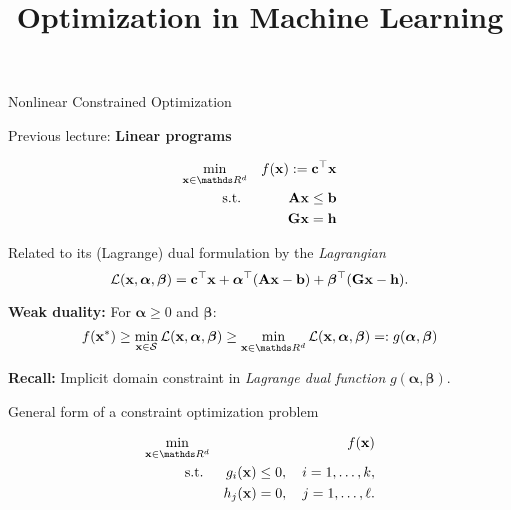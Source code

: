 \documentclass[11pt,compress,t,notes=noshow, xcolor=table]{beamer}
\title{Optimization in Machine Learning}
\begin{document}

\begin{vbframe}{Nonlinear Constrained Optimization}

Previous lecture: \textbf{Linear programs}

\vspace{-\baselineskip}

\begin{eqnarray*}
 \min_{\xv \in \R^d} && f(\xv) := \mathbf{c}^\top\xv \\
\text{s.t. } &&  \Amat \xv \le \mathbf{b}\\
             && \mathbf{G} \xv = \mathbf{h} 
\end{eqnarray*}

Related to its (Lagrange) dual formulation by the \textit{Lagrangian}
\begin{equation*}
    \mathcal{L}(\mathbf{x},\bm{\alpha},\bm{\beta}) = \mathbf{c}^\top \mathbf{x} + \bm{\alpha}^\top (\mathbf{A} \mathbf{x} - \mathbf{b}) + \bm{\beta}^\top (\mathbf{G} \mathbf{x} - \mathbf{h}).
\end{equation*}

\textbf{Weak duality:} For $\bm{\alpha} \geq 0$ and $\bm{\beta}$:
\begin{equation*}
    f(\xv^\ast) \geq \min_{\xv \in \mathcal{S}} \mathcal{L}(\xv, \bm{\alpha}, \bm{\beta}) \geq \min_{\xv \in \R^d} \mathcal{L}(\xv, \bm{\alpha}, \bm{\beta}) =: g(\bm{\alpha}, \bm{\beta})
\end{equation*}

\textbf{Recall:} Implicit domain constraint in \textit{Lagrange dual function} $g(\bm{\alpha}, \bm{\beta})$.

\framebreak

General form of a constraint optimization problem

\vspace{-\baselineskip}

\begin{eqnarray*}
 \min_{\xv \in \R^d} && f(\xv) \\
\text{s.t. } && g_i(\xv) \le 0, \quad i=1,\ldots, k, \\
             && h_j(\xv) = 0, \quad j=1,\ldots, \ell.
\end{eqnarray*}


\end{vbframe}
\end{document}
